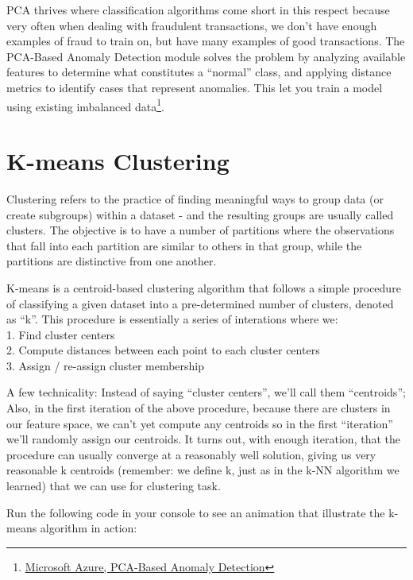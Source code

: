 \documentclass[]{article}
\let\rmarkdownfootnote\footnote%
\def\footnote{\protect\rmarkdownfootnote}
\begin{document}
PCA thrives where classification algorithms come short in this respect
because very often when dealing with fraudulent transactions, we don't
have enough examples of fraud to train on, but have many examples of
good transactions. The PCA-Based Anomaly Detection module solves the
problem by analyzing available features to determine what constitutes a
``normal'' class, and applying distance metrics to identify cases that
represent anomalies. This let you train a model using existing
imbalanced data\footnote{\href{https://docs.microsoft.com/en-us/azure/machine-learning/studio-module-reference/pca-based-anomaly-detection}{Microsoft
  Azure, PCA-Based Anomaly Detection}}.

\hypertarget{k-means-clustering}{%
\section{K-means Clustering}\label{k-means-clustering}}

Clustering refers to the practice of finding meaningful ways to group
data (or create subgroups) within a dataset - and the resulting groups
are usually called clusters. The objective is to have a number of
partitions where the observations that fall into each partition are
similar to others in that group, while the partitions are distinctive
from one another.

K-means is a centroid-based clustering algorithm that follows a simple
procedure of classifying a given dataset into a pre-determined number of
clusters, denoted as ``k''. This procedure is essentially a series of
interations where we:\\
1. Find cluster centers\\
2. Compute distances between each point to each cluster centers\\
3. Assign / re-assign cluster membership

A few technicality: Instead of saying ``cluster centers'', we'll call
them ``centroids''; Also, in the first iteration of the above procedure,
because there are clusters in our feature space, we can't yet compute
any centroids so in the first ``iteration'' we'll randomly assign our
centroids. It turns out, with enough iteration, that the procedure can
usually converge at a reasonably well solution, giving us very
reasonable k centroids (remember: we define k, just as in the k-NN
algorithm we learned) that we can use for clustering task.

Run the following code in your console to see an animation that
illustrate the k-means algorithm in action:
\end{document}
